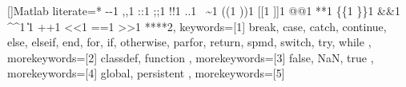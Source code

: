 
[]{Matlab}{%
    literate=*%
        {-}{\textcolor{Operator}{-}}{1}%
        {,}{\textcolor{Operator}{,}}{1}%
        {:}{\textcolor{Operator}{:}}{1}%
        {;}{\textcolor{Operator}{;}}{1}%
        {!}{\textcolor{Operator}{!}}{1}%
        {.}{\textcolor{Operator}{.}}{1}%
        {~}{\textcolor{Operator}{\~{}}}{1}%
        {(}{\textcolor{Operator}{(}}{1}%
        {)}{\textcolor{Operator}{)}}{1}%
        {[}{\textcolor{Operator}{[}}{1}%
        {]}{\textcolor{Operator}{]}}{1}%
        {@}{\textcolor{Operator}{@}}{1}%
        {*}{\textcolor{Operator}{*}}{1}%
        {\{}{\textcolor{Operator}{\{}}{1}%
        {\}}{\textcolor{Operator}{\}}}{1}%
        {\&}{\textcolor{Operator}{\&}}{1}%
        {\^}{\textcolor{Operator}{\^{}}}{1}%
        {\|}{\textcolor{Operator}{\|}}{1}%
        {+}{\textcolor{Operator}{+}}{1}%
        {<}{\textcolor{Operator}{<}}{1}%
        {=}{\textcolor{Operator}{=}}{1}%
        {>}{\textcolor{Operator}{>}}{1}%
        {**}{\textcolor{Operator}{**}}{2},%
    keywords=[1]{%
        break,
        case,
        catch,
        continue,
        else,
        elseif,
        end,
        for,
        if,
        otherwise,
        parfor,
        return,
        spmd,
        switch,
        try,
        while%
    },
    morekeywords=[2]{%
        classdef,
        function%
    },
    morekeywords=[3]{%
        false,%
        NaN,%
        true%
    },
    morekeywords=[4]{%
        global,%
        persistent%
    },
    morekeywords=[5]{%
}}
